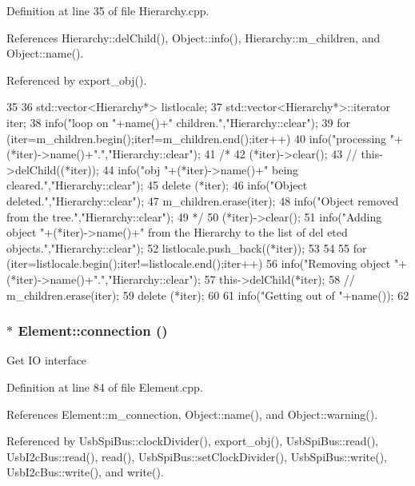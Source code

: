 Definition at line 35 of file Hierarchy.cpp.

References Hierarchy::delChild(), Object::info(), Hierarchy::m\_\-children, and Object::name().

Referenced by export\_\-obj().


\begin{DoxyCode}
35                      {
36   std::vector<Hierarchy*> listlocale;
37   std::vector<Hierarchy*>::iterator iter;
38   info("loop on "+name()+" children.","Hierarchy::clear");
39   for (iter=m_children.begin();iter!=m_children.end();iter++){
40       info("processing "+(*iter)->name()+".","Hierarchy::clear");
41 /*
42       (*iter)->clear();
43 //      this->delChild((*iter));
44       info("obj "+(*iter)->name()+" being cleared.","Hierarchy::clear");
45       delete (*iter);
46       info("Object deleted.","Hierarchy::clear");
47       m_children.erase(iter);
48       info("Object removed from the tree.","Hierarchy::clear");
49 */
50     (*iter)->clear();
51     info("Adding object "+(*iter)->name()+" from the Hierarchy to the list of del
      eted objects.","Hierarchy::clear");
52     listlocale.push_back((*iter));
53   }
54 
55   for (iter=listlocale.begin();iter!=listlocale.end();iter++){
56     info("Removing object "+(*iter)->name()+".","Hierarchy::clear");
57     this->delChild(*iter);
58 //    m_children.erase(iter);
59     delete (*iter);
60   }
61   info("Getting out of "+name());
62 }
\end{DoxyCode}
\hypertarget{classElement_af57444353c1ddf9fa0109801e97debf7}{
\subsubsection[{connection}]{ $\ast$ Element::connection ()}}
\label{classElement_af57444353c1ddf9fa0109801e97debf7}
Get IO interface 

Definition at line 84 of file Element.cpp.

References Element::m\_\-connection, Object::name(), and Object::warning().

Referenced by UsbSpiBus::clockDivider(), export\_\-obj(), UsbSpiBus::read(), UsbI2cBus::read(), read(), UsbSpiBus::setClockDivider(), UsbSpiBus::write(), UsbI2cBus::write(), and write().


